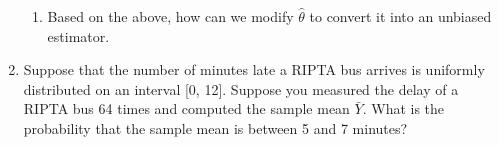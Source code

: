 \documentclass[12pt]{article}
\begin{document}
\begin{enumerate}
\begin{enumerate}
\item Based on the above, how can we modify $\hat{\theta}$ to convert it into an unbiased estimator.
\end{enumerate}

\item Suppose that the number of minutes late a RIPTA bus arrives is uniformly distributed on an interval [0, 12]. Suppose you measured the delay of a RIPTA bus 64 times and computed the sample mean $\bar{Y}$. What is the probability that the sample mean is between 5 and 7 minutes?

\end{enumerate}
\end{document}
